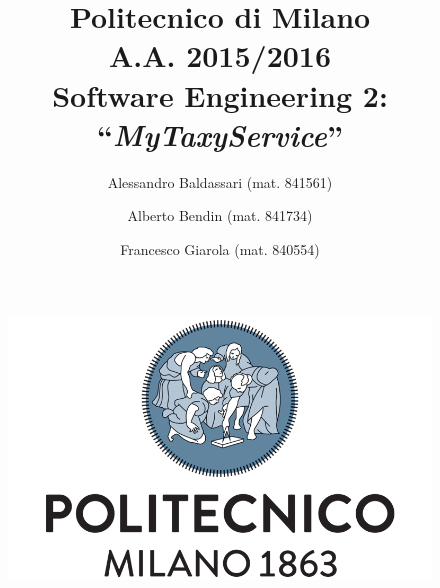 \documentclass[a4paper,11pt]{report} %
\title{Politecnico di Milano\\A.A. 2015/2016\\Software Engineering 2: ``{\em MyTaxyService}''}
\author{Alessandro Baldassari (mat. 841561) \and Alberto Bendin (mat. 841734) \and Francesco Giarola (mat. 840554)}
\begin{document}
	
	
	\begin{figure}[t]
		\centering
			\includegraphics[width=1\linewidth]{"Pictures/polimi-logo"}
		\label{fig:polimi-logo}
	\end{figure}
	
	\maketitle
		
	

	\thispagestyle{empty}
	\clearpage\mbox{}\clearpage
	
	
	
	\renewcommand*\thesection{\arabic{section}}
	\renewcommand*\thesubsection{\arabic{section}.\arabic{subsection}}
	\renewcommand*\thesubsubsection{%
		\arabic{section}.\arabic{subsection}.\arabic{subsubsection}%
	}
	\setcounter{secnumdepth}{4}
	\setcounter{tocdepth}{4}
		
	
	\tableofcontents
	\newpage
	
	
	
\end{document}
